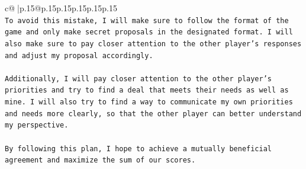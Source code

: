 \documentclass{article}
\begin{document}
{\begin{supertabular}{c@{$\;$}|p{.15\linewidth}@{}p{.15\linewidth}p{.15\linewidth}p{.15\linewidth}p{.15\linewidth}p{.15\linewidth}}
{{{\\ 
\texttt{To avoid this mistake, I will make sure to follow the format of the game and only make secret proposals in the designated format. I will also make sure to pay closer attention to the other player's responses and adjust my proposal accordingly.} \\
\\ 
\texttt{Additionally, I will pay closer attention to the other player's priorities and try to find a deal that meets their needs as well as mine. I will also try to find a way to communicate my own priorities and needs more clearly, so that the other player can better understand my perspective.} \\
\\ 
\texttt{By following this plan, I hope to achieve a mutually beneficial agreement and maximize the sum of our scores.} \\
            }
        }
    }
     \\ \\

\end{supertabular}
}
\end{document}
